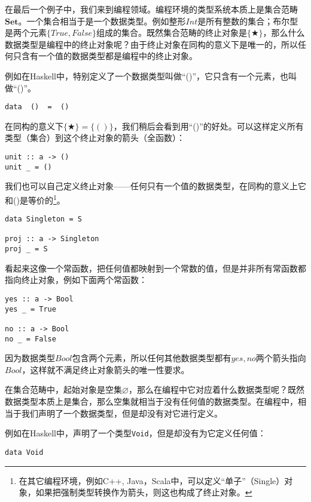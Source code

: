 \documentclass{article}
\begin{document}
\begin{example}
在最后一个例子中，我们来到编程领域。编程环境的类型系统本质上是集合范畴$\pmb{Set}$。一个集合相当于是一个数据类型。例如整形$Int$是所有整数的集合；布尔型是两个元素$\{True, False\}$组成的集合。既然集合范畴的终止对象是$\{ \bigstar \}$，那么什么数据类型是编程中的终止对象呢？由于终止对象在同构的意义下是唯一的，所以任何只含有一个值的数据类型都是编程中的终止对象。

例如在Haskell中，特别定义了一个数据类型叫做“()”，它只含有一个元素，也叫做“()”。

\begin{lstlisting}
data  ()  =  ()
\end{lstlisting}

在同构的意义下$\{ \bigstar \} = \{()\}$，我们稍后会看到用“()”的好处。可以这样定义所有类型（集合）到这个终止对象的箭头（全函数）：

\begin{lstlisting}
unit :: a -> ()
unit _ = ()
\end{lstlisting}

我们也可以自己定义终止对象——任何只有一个值的数据类型，在同构的意义上它和()是等价的\footnote{在其它编程环境，例如C++, Java，Scala中，可以定义“单子”（Single）对象，如果把强制类型转换作为箭头，则这也构成了终止对象。}。

\begin{lstlisting}
data Singleton = S

proj :: a -> Singleton
proj _ = S
\end{lstlisting}

看起来这像一个常函数，把任何值都映射到一个常数的值，但是并非所有常函数都指向终止对象，例如下面两个常函数：

\begin{lstlisting}
yes :: a -> Bool
yes _ = True

no :: a -> Bool
no _ = False
\end{lstlisting}

因为数据类型$Bool$包含两个元素，所以任何其他数据类型都有$yes, no$两个箭头指向$Bool$，这样就不满足终止对象箭头的唯一性要求。

在集合范畴中，起始对象是空集$\varnothing$，那么在编程中它对应着什么数据类型呢？既然数据类型本质上是集合，那么空集就相当于没有任何值的数据类型。在编程中，相当于我们声明了一个数据类型，但是却没有对它进行定义。

例如在Haskell中，声明了一个类型\texttt{Void}，但是却没有为它定义任何值：

\begin{lstlisting}
data Void
\end{lstlisting}


\end{example}
\end{document}

